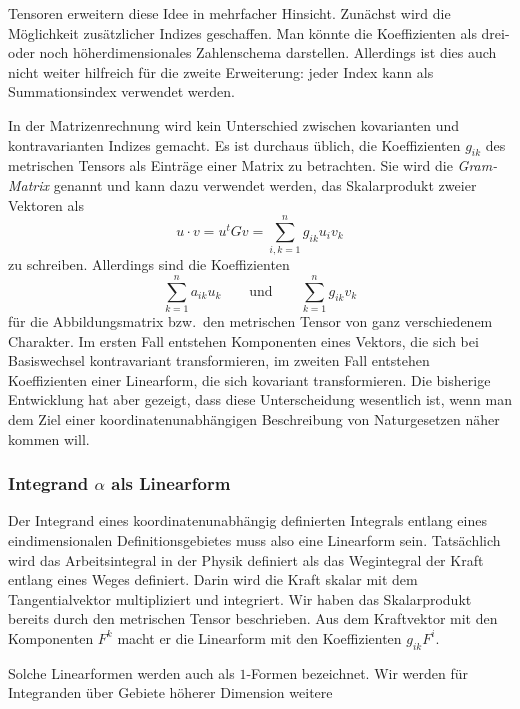 Tensoren erweitern diese Idee in mehrfacher Hinsicht.
Zunächst wird die Möglichkeit zusätzlicher Indizes geschaffen.
Man könnte die Koeffizienten als drei- oder noch höherdimensionales
Zahlenschema darstellen.
Allerdings ist dies auch nicht weiter hilfreich für die zweite
Erweiterung: jeder Index kann als Summationsindex verwendet werden.

In der Matrizenrechnung wird kein Unterschied zwischen kovarianten
und kontravarianten Indizes gemacht.
%
%
Es ist durchaus üblich, die Koeffizienten $g_{ik}$ des metrischen
Tensors als Einträge einer Matrix zu betrachten.
Sie wird die {\em Gram-Matrix} genannt und kann dazu verwendet
%
werden, das Skalarprodukt zweier Vektoren als 
\[
u\cdot v
=
u^t G v
=
\sum_{i,k=1}^n
g_{ik}u_iv_k
\]
zu schreiben.
Allerdings sind die Koeffizienten
\[
\sum_{k=1}^n a_{ik}u_k
\qquad\text{und}\qquad
\sum_{k=1}^n g_{ik}v_k
\]
für die Abbildungsmatrix bzw.~den metrischen Tensor von ganz verschiedenem
Charakter.
Im ersten Fall entstehen Komponenten eines Vektors, die sich bei Basiswechsel
kontravariant transformieren, im zweiten Fall entstehen Koeffizienten
einer Linearform, die sich kovariant transformieren.
Die bisherige Entwicklung hat aber gezeigt, dass diese Unterscheidung
wesentlich ist, wenn man dem Ziel einer koordinatenunabhängigen
Beschreibung von Naturgesetzen näher kommen will.

%
%
\subsubsection{Integrand $\alpha$ als Linearform}
Der Integrand eines koordinatenunabhängig definierten Integrals entlang
eines eindimensionalen Definitionsgebietes muss also eine
Linearform sein.
Tatsächlich wird das Arbeitsintegral in der Physik definiert als
das Wegintegral der Kraft entlang eines Weges definiert.
%
Darin wird die Kraft skalar mit dem Tangentialvektor multipliziert
und integriert.
Wir haben das Skalarprodukt bereits durch den metrischen Tensor
beschrieben.
Aus dem Kraftvektor mit den Komponenten $F^k$ macht er die Linearform
mit den Koeffizienten $g_{ik}F^i$.

Solche Linearformen werden auch als $1$-Formen bezeichnet.
Wir werden für Integranden über Gebiete höherer Dimension weitere

%
%
